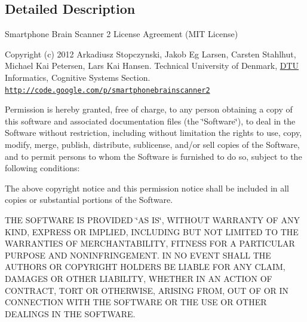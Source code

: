 \subsection{Detailed Description}
Smartphone Brain Scanner 2 License Agreement (M\-I\-T License)

Copyright (c) 2012 Arkadiusz Stopczynski, Jakob Eg Larsen, Carsten Stahlhut, Michael Kai Petersen, Lars Kai Hansen. Technical University of Denmark, \hyperlink{namespaceDTU}{D\-T\-U} Informatics, Cognitive Systems Section. \href{http://code.google.com/p/smartphonebrainscanner2}{\tt http\-://code.\-google.\-com/p/smartphonebrainscanner2}

Permission is hereby granted, free of charge, to any person obtaining a copy of this software and associated documentation files (the \char`\"{}\-Software\char`\"{}), to deal in the Software without restriction, including without limitation the rights to use, copy, modify, merge, publish, distribute, sublicense, and/or sell copies of the Software, and to permit persons to whom the Software is furnished to do so, subject to the following conditions\-:

The above copyright notice and this permission notice shall be included in all copies or substantial portions of the Software.

T\-H\-E S\-O\-F\-T\-W\-A\-R\-E I\-S P\-R\-O\-V\-I\-D\-E\-D \char`\"{}\-A\-S I\-S\char`\"{}, W\-I\-T\-H\-O\-U\-T W\-A\-R\-R\-A\-N\-T\-Y O\-F A\-N\-Y K\-I\-N\-D, E\-X\-P\-R\-E\-S\-S O\-R I\-M\-P\-L\-I\-E\-D, I\-N\-C\-L\-U\-D\-I\-N\-G B\-U\-T N\-O\-T L\-I\-M\-I\-T\-E\-D T\-O T\-H\-E W\-A\-R\-R\-A\-N\-T\-I\-E\-S O\-F M\-E\-R\-C\-H\-A\-N\-T\-A\-B\-I\-L\-I\-T\-Y, F\-I\-T\-N\-E\-S\-S F\-O\-R A P\-A\-R\-T\-I\-C\-U\-L\-A\-R P\-U\-R\-P\-O\-S\-E A\-N\-D N\-O\-N\-I\-N\-F\-R\-I\-N\-G\-E\-M\-E\-N\-T. I\-N N\-O E\-V\-E\-N\-T S\-H\-A\-L\-L T\-H\-E A\-U\-T\-H\-O\-R\-S O\-R C\-O\-P\-Y\-R\-I\-G\-H\-T H\-O\-L\-D\-E\-R\-S B\-E L\-I\-A\-B\-L\-E F\-O\-R A\-N\-Y C\-L\-A\-I\-M, D\-A\-M\-A\-G\-E\-S O\-R O\-T\-H\-E\-R L\-I\-A\-B\-I\-L\-I\-T\-Y, W\-H\-E\-T\-H\-E\-R I\-N A\-N A\-C\-T\-I\-O\-N O\-F C\-O\-N\-T\-R\-A\-C\-T, T\-O\-R\-T O\-R O\-T\-H\-E\-R\-W\-I\-S\-E, A\-R\-I\-S\-I\-N\-G F\-R\-O\-M, O\-U\-T O\-F O\-R I\-N C\-O\-N\-N\-E\-C\-T\-I\-O\-N W\-I\-T\-H T\-H\-E S\-O\-F\-T\-W\-A\-R\-E O\-R T\-H\-E U\-S\-E O\-R O\-T\-H\-E\-R D\-E\-A\-L\-I\-N\-G\-S I\-N T\-H\-E S\-O\-F\-T\-W\-A\-R\-E. 

